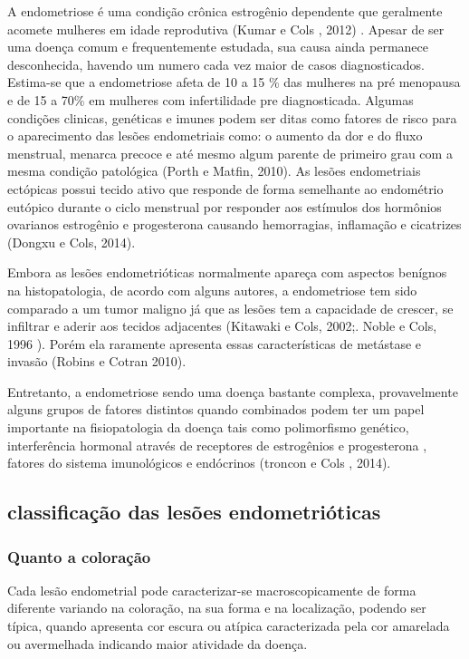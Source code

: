 \documentclass[12pt]{article} %
\begin{document}
A endometriose é uma condição crônica estrogênio dependente que geralmente acomete mulheres em idade reprodutiva (Kumar e Cols , 2012) . Apesar de ser uma doença comum e frequentemente estudada, sua causa ainda permanece desconhecida, havendo um numero cada vez maior de casos diagnosticados. Estima-se que a endometriose afeta de 10 a 15 \% das mulheres na pré menopausa e de 15 a 70\% em mulheres com infertilidade pre diagnosticada. Algumas condições clinicas, genéticas e imunes podem ser ditas como fatores de risco para o aparecimento  das lesões endometriais como: o aumento da dor e do fluxo menstrual, menarca precoce e até mesmo algum parente de primeiro grau com a mesma condição patológica (Porth e Matfin, 2010).
As lesões endometriais ectópicas possui tecido ativo que responde de forma semelhante ao endométrio eutópico durante o ciclo menstrual por responder aos estímulos dos hormônios ovarianos estrogênio e progesterona causando hemorragias, inflamação e cicatrizes (Dongxu e Cols, 2014).

Embora as lesões endometrióticas  normalmente apareça com aspectos benígnos na histopatologia, de acordo com alguns autores, a endometriose tem sido comparado a um tumor maligno já que as lesões tem a capacidade de crescer, se infiltrar e aderir aos tecidos adjacentes (Kitawaki e Cols, 2002;. Noble e Cols, 1996 ). Porém ela raramente apresenta essas características de metástase e invasão (Robins e Cotran 2010).

Entretanto, a endometriose sendo uma doença bastante complexa, provavelmente alguns grupos de fatores distintos quando combinados podem ter um papel importante na fisiopatologia da doença tais como polimorfismo genético, interferência hormonal através de receptores de estrogênios e progesterona , fatores do sistema imunológicos e endócrinos (troncon e Cols , 2014).

\subsection{classificação das lesões endometrióticas}


\subsubsection{Quanto a coloração}

Cada lesão endometrial pode caracterizar-se macroscopicamente de forma diferente variando na coloração, na sua forma e na localização, podendo ser típica, quando apresenta cor escura ou atípica caracterizada pela cor amarelada ou avermelhada indicando maior atividade da doença.
\end{document}
